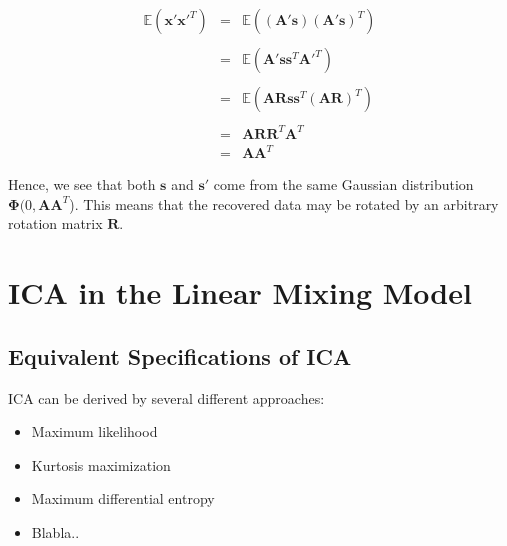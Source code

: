 \documentclass[11pt, oneside, a4paper]{report}
\begin{document}
\begin{equation}
  \begin{array}{lcl}
    \mathbb{E}(\boldsymbol{x}'\boldsymbol{x}'^T) & = &
    \mathbb{E}((\boldsymbol{A}'\boldsymbol{s})(\boldsymbol{A}'\boldsymbol{s})^T) \\
    \\& = & \mathbb{E}(\boldsymbol{A}'\boldsymbol{s}\boldsymbol{s}^T\boldsymbol{A}'^T) \\
    \\& = & \mathbb{E}(\boldsymbol{A}\boldsymbol{R}\boldsymbol{s}\boldsymbol{s}^T(\boldsymbol{A}\boldsymbol{R})^T) \\
    \\& = & \boldsymbol{A}\boldsymbol{R}\boldsymbol{R}^T\boldsymbol{A}^T
    \\& = & \boldsymbol{A}\boldsymbol{A}^T
  \end{array}
\end{equation}

Hence, we see that both $\boldsymbol{s}$ and $\boldsymbol{s}'$ come
from the same Gaussian distribution $\boldsymbol{\Phi}(0,
\boldsymbol{A}\boldsymbol{A}^T$). This means that the recovered data
may be rotated by an arbitrary rotation matrix $\boldsymbol{R}$. 



\section{ICA in the Linear Mixing Model}





\subsection{Equivalent Specifications of ICA}

ICA can be derived by several different approaches:
\begin{itemize}
  \item Maximum likelihood
  \item Kurtosis maximization
  \item Maximum differential entropy
  \item Blabla..
\end{itemize}
\end{document}
